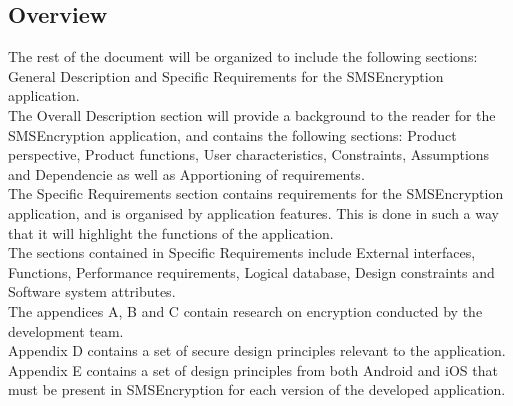 \subsection{Overview}
The rest of the document will be organized to include the following sections: General Description and Specific Requirements for the SMSEncryption application.
\vspace{10pt}\\
The Overall Description section will provide a background to the reader for the SMSEncryption application, and contains the following sections: Product perspective, Product functions, User characteristics, Constraints,  Assumptions and Dependencie as well as Apportioning of requirements.
\vspace{10pt}\\
The Specific Requirements section contains requirements for the SMSEncryption application, and is organised by application features. This is done in such a way that it will highlight the functions of the application. 
\vspace{10pt}\\
The sections contained in Specific Requirements include External interfaces, Functions, Performance requirements, Logical database, Design constraints and Software system attributes.
\vspace{10pt}\\
The appendices A, B and C contain research on encryption conducted by the development team.
\vspace{10pt}\\
Appendix D contains a set of secure design principles relevant to the application.
\vspace{10pt}\\
Appendix E contains a set of design principles from both Android and iOS that must be present in SMSEncryption for each version of the developed application.


